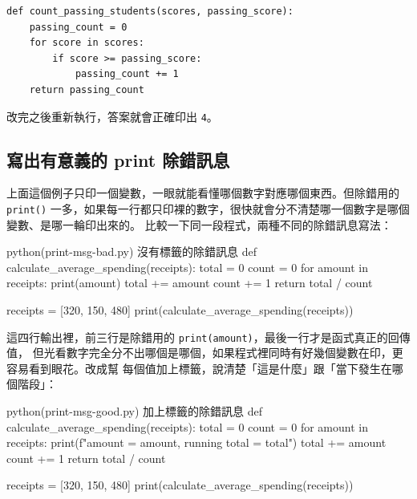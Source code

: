 \begin{verbatim}
def count_passing_students(scores, passing_score):
    passing_count = 0
    for score in scores:
        if score >= passing_score:
            passing_count += 1
    return passing_count
\end{verbatim}

改完之後重新執行，答案就會正確印出 \texttt{4}。

\subsection*{寫出有意義的 print 除錯訊息}

上面這個例子只印一個變數，一眼就能看懂哪個數字對應哪個東西。但除錯用的 \texttt{print()}
一多，如果每一行都只印裸的數字，很快就會分不清楚哪一個數字是哪個變數、是哪一輪印出來的。
比較一下同一段程式，兩種不同的除錯訊息寫法：

\begin{example}{python}{(print-msg-bad.py) 沒有標籤的除錯訊息}
def calculate_average_spending(receipts):
    total = 0
    count = 0
    for amount in receipts:
        print(amount)
        total += amount
        count += 1
    return total / count

receipts = [320, 150, 480]
print(calculate_average_spending(receipts))
\end{example}


這四行輸出裡，前三行是除錯用的 \texttt{print(amount)}，最後一行才是函式真正的回傳值，
但光看數字完全分不出哪個是哪個，如果程式裡同時有好幾個變數在印，更容易看到眼花。改成幫
每個值加上標籤，說清楚「這是什麼」跟「當下發生在哪個階段」：

\begin{example}{python}{(print-msg-good.py) 加上標籤的除錯訊息}
def calculate_average_spending(receipts):
    total = 0
    count = 0
    for amount in receipts:
        print(f"amount = {amount}, running total = {total}")
        total += amount
        count += 1
    return total / count

receipts = [320, 150, 480]
print(calculate_average_spending(receipts))
\end{example}


